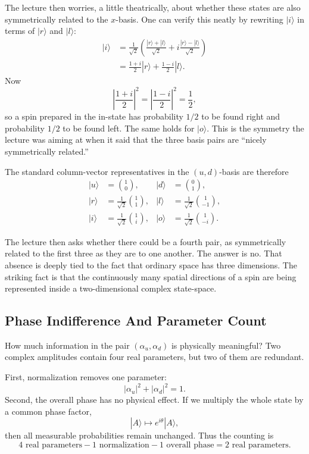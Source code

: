 The lecture then worries, a little theatrically, about whether these states are also symmetrically related to the \(x\)-basis. One can verify this neatly by rewriting \(|i\rangle\) in terms of \(|r\rangle\) and \(|l\rangle\):
\begin{align}
|i\rangle
&=
\frac{1}{\sqrt2}
\left(
\frac{|r\rangle+|l\rangle}{\sqrt2}
+
i\frac{|r\rangle-|l\rangle}{\sqrt2}
\right)\\
&=
\frac{1+i}{2}|r\rangle+\frac{1-i}{2}|l\rangle.
\end{align}
Now
\begin{equation}
\left|\frac{1+i}{2}\right|^2=\left|\frac{1-i}{2}\right|^2=\frac12,
\end{equation}
so a spin prepared in the in-state has probability \(1/2\) to be found right and probability \(1/2\) to be found left. The same holds for \(|o\rangle\). This is the symmetry the lecture was aiming at when it said that the three basis pairs are ``nicely symmetrically related.''

The standard column-vector representatives in the \((u,d)\)-basis are therefore
\begin{align}
|u\rangle &= \binom10,
&
|d\rangle &= \binom01,
\\
|r\rangle &= \frac{1}{\sqrt2}\binom11,
&
|l\rangle &= \frac{1}{\sqrt2}\binom1{-1},
\\
|i\rangle &= \frac{1}{\sqrt2}\binom1{i},
&
|o\rangle &= \frac{1}{\sqrt2}\binom1{-i}.
\end{align}

The lecture then asks whether there could be a fourth pair, as symmetrically related to the first three as they are to one another. The answer is no. That absence is deeply tied to the fact that ordinary space has three dimensions. The striking fact is that the continuously many spatial directions of a spin are being represented inside a two-dimensional complex state-space.

\subsection{Phase Indifference And Parameter Count}

How much information in the pair \((\alpha_u,\alpha_d)\) is physically meaningful? Two complex amplitudes contain four real parameters, but two of them are redundant.

First, normalization removes one parameter:
\begin{equation}
|\alpha_u|^2+|\alpha_d|^2=1.
\end{equation}
Second, the overall phase has no physical effect. If we multiply the whole state by a common phase factor,
\begin{equation}
|A\rangle \longmapsto e^{i\theta}|A\rangle,
\end{equation}
then all measurable probabilities remain unchanged. Thus the counting is
\begin{equation}
4\text{ real parameters}
-
1\text{ normalization}
-
1\text{ overall phase}
=
2\text{ real parameters}.
\end{equation}

